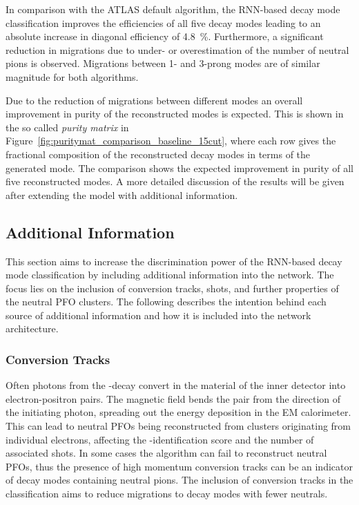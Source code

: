 In comparison with the ATLAS default algorithm, the RNN-based decay mode
classification improves the efficiencies of all five decay modes leading to an
absolute increase in diagonal efficiency of \SI{4.8}{\percent}. Furthermore, a
significant reduction in migrations due to under- or overestimation of the
number of neutral pions is observed. Migrations between 1- and 3-prong modes are
of similar magnitude for both algorithms.

Due to the reduction of migrations between different modes an overall
improvement in purity of the reconstructed modes is expected. This is shown in
the so called \emph{purity matrix} in
Figure~\ref{fig:puritymat_comparison_baseline_15cut}, where each row gives the
fractional composition of the reconstructed decay modes in terms of the
generated mode. The comparison shows the expected improvement in purity of all
five reconstructed modes. A more detailed discussion of the results will be
given after extending the model with additional information.

\subsection{Additional Information}
\label{sec:add_info}

This section aims to increase the discrimination power of the RNN-based decay
mode classification by including additional information into the network. The
focus lies on the inclusion of conversion tracks, shots, and further properties
of the neutral PFO clusters. The following describes the intention behind each
source of additional information and how it is included into the network
architecture.

\subsubsection{Conversion Tracks}
Often photons from the -decay convert in the material of the
inner detector into electron-positron pairs. The magnetic field bends the pair
from the direction of the initiating photon, spreading out the energy deposition
in the EM calorimeter. This can lead to neutral PFOs being reconstructed from
clusters originating from individual electrons, affecting the
-identification score and the number of associated shots. In some
cases the algorithm can fail to reconstruct neutral PFOs, thus the presence of
high momentum conversion tracks can be an indicator of decay modes containing
neutral pions. The inclusion of conversion tracks in the classification aims to
reduce migrations to decay modes with fewer neutrals.


